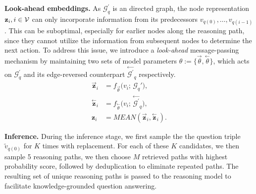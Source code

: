 \documentclass{article}
\theoremstyle{plain}
\theoremstyle{definition}
\theoremstyle{remark}
\newcommand{\tb}[1]{\textbf{#1}}
\newcommand{\mcal}[1]{\mathcal{#1}}
\begin{document}
\tb{Look-ahead embeddings.} As $\mcal{G}_q^\prime$ is an directed graph, the node representation $\rvz_i, i \in \mcal{V}$ can only incorporate information from its predecessors $v_{q(0)}, \dots, v_{q(i-1)}$. This can be suboptimal, especially for earlier nodes along the reasoning path, since they cannot utilize the information from subsequent nodes to determine the next action. To address this issue, we introduce a \emph{look-ahead} message-passing mechanism by maintaining two sets of model parameters $\theta:= \{\overset{\rightarrow}{\theta},\overset{\leftarrow}{\theta}\}$, which acts on $\mcal{G}_q^\prime$ and its edge-reversed counterpart $\overset{\leftarrow}{\mcal{G}^\prime}_q$ respectively.
\begin{equation}
\label{eq:look_ahead}
\begin{aligned}
\overset{\rightarrow}{\mathbf{z}}_{i} 
&= f_{\overset{\rightarrow}{\theta}}\bigl(v_i;\,\mcal{G}_q'\bigr),
\\[1pt]
\overset{\leftarrow}{\mathbf{z}}_{i} 
&= f_{\overset{\leftarrow}{\theta}}\bigl(v_i;\,\overset{\leftarrow}{\mcal{G}^\prime}_q\bigr),
\\[1pt]
\mathbf{z}_i 
&= MEAN(\overset{\rightarrow}{\mathbf{z}}_{i}, \overset{\leftarrow}{\mathbf{z}}_{i}).
\end{aligned}
\end{equation}

\tb{Inference.} During the inference stage, we first sample the the question triple $\widetilde{v}_{q(0)}$ for $K$ times with replacement. For each of these $K$ candidates, we then sample 5 reasoning paths, we then choose $M$ retrieved paths with highest probability score, followed by deduplication to eliminate repeated paths. The resulting set of unique reasoning paths is passed to the reasoning model to facilitate knowledge-grounded question answering.
\end{document}
